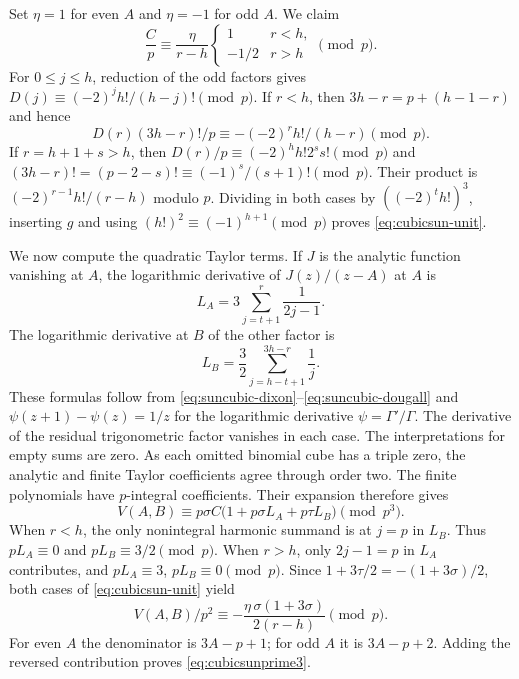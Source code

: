 \documentclass[11pt,a4paper]{article}
\begin{document}
Set $\eta=1$ for even $A$ and $\eta=-1$ for odd $A$. We claim
\begin{equation}\label{eq:cubicsun-unit}
 \frac C p \equiv \frac{\eta}{r-h}
 \begin{cases}1&r<h,\\ -1/2&r>h\end{cases}\pmod p .
\end{equation}
For $0\le j\le h$, reduction of the odd factors gives
$D(j)\equiv(-2)^j h!/(h-j)!\pmod p$.
If $r<h$, then $3h-r=p+(h-1-r)$ and hence
\[
 D(r)(3h-r)!/p\equiv-(-2)^r h!/(h-r)\pmod p.
\]
If $r=h+1+s>h$, then
$D(r)/p\equiv(-2)^h h!2^s s!\pmod p$ and
$(3h-r)!=(p-2-s)!\equiv(-1)^s/(s+1)!\pmod p$.
Their product is $(-2)^{r-1}h!/(r-h)$ modulo $p$.
Dividing in both cases by $((-2)^t h!)^3$, inserting $g$ and using $(h!)^2\equiv(-1)^{h+1}\pmod p$ proves \eqref{eq:cubicsun-unit}.

We now compute the quadratic Taylor terms. If $J$ is the analytic function vanishing at $A$, the logarithmic derivative of $J(z)/(z-A)$ at $A$ is
\[
 L_A=3\sum_{j=t+1}^{r}\frac{1}{2j-1}.
\]
The logarithmic derivative at $B$ of the other factor is
\[
 L_B=\frac32\sum_{j=h-t+1}^{3h-r}\frac1j.
\]
These formulas follow from \eqref{eq:suncubic-dixon}--\eqref{eq:suncubic-dougall} and $\psi(z+1)-\psi(z)=1/z$ for the logarithmic derivative $\psi=\Gamma'/\Gamma$. The derivative of the residual trigonometric factor vanishes in each case. The interpretations for empty sums are zero.
As each omitted binomial cube has a triple zero, the analytic and finite Taylor coefficients agree through order two. The finite polynomials have $p$-integral coefficients. Their expansion therefore gives
\[
 V(A,B)\equiv p\sigma C\bigl(1+p\sigma L_A+p\tau L_B\bigr)\pmod{p^3}.
\]
When $r<h$, the only nonintegral harmonic summand is at $j=p$ in $L_B$. Thus $p L_A\equiv0$ and $pL_B\equiv3/2\pmod p$. When $r>h$, only $2j-1=p$ in $L_A$ contributes, and $pL_A\equiv3$, $pL_B\equiv0\pmod p$. Since $1+3\tau/2=-(1+3\sigma)/2$, both cases of \eqref{eq:cubicsun-unit} yield
\[
 V(A,B)/p^2\equiv-\frac{\eta\,\sigma(1+3\sigma)}{2(r-h)}\pmod p.
\]
For even $A$ the denominator is $3A-p+1$; for odd $A$ it is $3A-p+2$. Adding the reversed contribution proves \eqref{eq:cubicsunprime3}.
\end{document}
